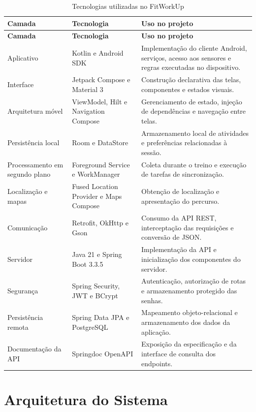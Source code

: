\begin{longtable}{p{}p{}p{}}
\caption{Tecnologias utilizadas no FitWorkUp}\label{tab:tecnologias_fitworkup}\\
\toprule
\textbf{Camada} & \textbf{Tecnologia} & \textbf{Uso no projeto} \\
\midrule
\endfirsthead
\toprule
\textbf{Camada} & \textbf{Tecnologia} & \textbf{Uso no projeto} \\
\midrule
\endhead
\bottomrule
\endfoot
Aplicativo & Kotlin e Android SDK & Implementação do cliente Android, serviços, acesso aos sensores e regras executadas no dispositivo. \\
Interface & Jetpack Compose e Material 3 & Construção declarativa das telas, componentes e estados visuais. \\
Arquitetura móvel & ViewModel, Hilt e Navigation Compose & Gerenciamento de estado, injeção de dependências e navegação entre telas. \\
Persistência local & Room e DataStore & Armazenamento local de atividades e preferências relacionadas à sessão. \\
Processamento em segundo plano & Foreground Service e WorkManager & Coleta durante o treino e execução de tarefas de sincronização. \\
Localização e mapas & Fused Location Provider e Maps Compose & Obtenção de localização e apresentação do percurso. \\
Comunicação & Retrofit, OkHttp e Gson & Consumo da API REST, interceptação das requisições e conversão de JSON. \\
Servidor & Java 21 e Spring Boot 3.3.5 & Implementação da API e inicialização dos componentes do servidor. \\
Segurança & Spring Security, JWT e BCrypt & Autenticação, autorização de rotas e armazenamento protegido das senhas. \\
Persistência remota & Spring Data JPA e PostgreSQL & Mapeamento objeto-relacional e armazenamento dos dados da aplicação. \\
Documentação da API & Springdoc OpenAPI & Exposição da especificação e da interface de consulta dos endpoints. \\
\end{longtable}

\section{Arquitetura do Sistema}
\label{sec:fitworkup_arquitetura}

